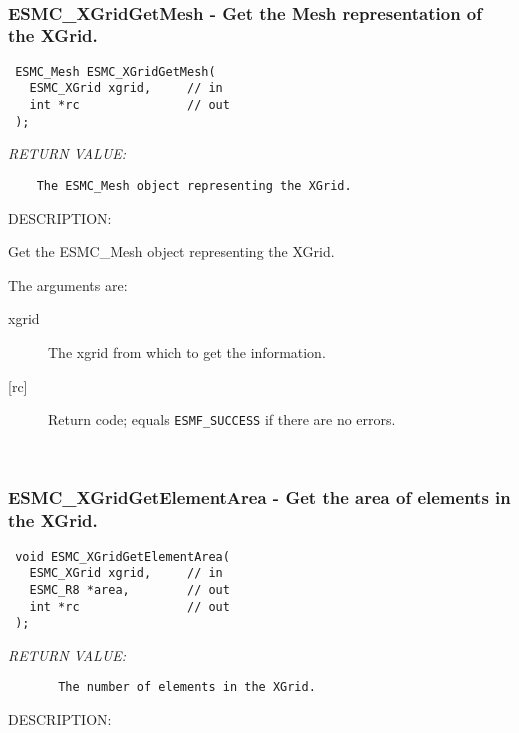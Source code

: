  
\mbox{}\hrulefill\ 
 
\subsubsection [ESMC\_XGridGetMesh] {ESMC\_XGridGetMesh - Get the Mesh representation of the XGrid. }


  
\begin{verbatim} ESMC_Mesh ESMC_XGridGetMesh(
   ESMC_XGrid xgrid,     // in
   int *rc               // out
 );
 \end{verbatim}{\em RETURN VALUE:}
\begin{verbatim}    The ESMC_Mesh object representing the XGrid. \end{verbatim}
{\sf DESCRIPTION:\\ }


  
    Get the ESMC\_Mesh object representing the XGrid. 
  
    The arguments are:
    \begin{description}
    \item[xgrid]
      The xgrid from which to get the information. 
    \item[{[rc]}]
      Return code; equals {\tt ESMF\_SUCCESS} if there are no errors.
    \end{description}
   
 
\mbox{}\hrulefill\ 
 
\subsubsection [ESMC\_XGridGetElementArea] {ESMC\_XGridGetElementArea - Get the area of elements in the XGrid.}


  
\begin{verbatim} void ESMC_XGridGetElementArea(
   ESMC_XGrid xgrid,     // in
   ESMC_R8 *area,        // out
   int *rc               // out
 );
 \end{verbatim}{\em RETURN VALUE:}
\begin{verbatim}       The number of elements in the XGrid.\end{verbatim}
{\sf DESCRIPTION:\\ }


